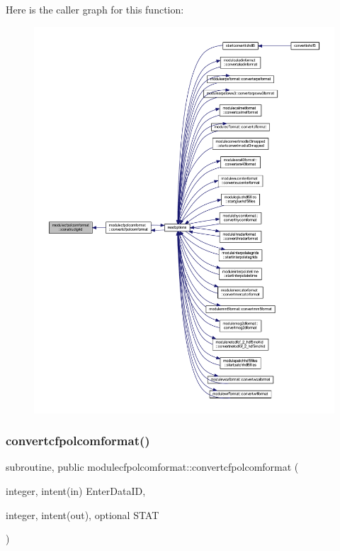 Here is the caller graph for this function\+:\nopagebreak
\begin{figure}[H]
\begin{center}
\leavevmode
\includegraphics[width=350pt]{namespacemodulecfpolcomformat_ae48cf997b8d44143cac43f824a76058d_icgraph}
\end{center}
\end{figure}
\mbox{\label{namespacemodulecfpolcomformat_a2792438e0105569c0bc2d1dc532a27b6}} 
\subsubsection{\texorpdfstring{convertcfpolcomformat()}{convertcfpolcomformat()}}
{\footnotesize\ttfamily subroutine, public modulecfpolcomformat\+::convertcfpolcomformat (\begin{DoxyParamCaption}\item[{integer, intent(in)}]{Enter\+Data\+ID,  }\item[{integer, intent(out), optional}]{S\+T\+AT }\end{DoxyParamCaption})}

